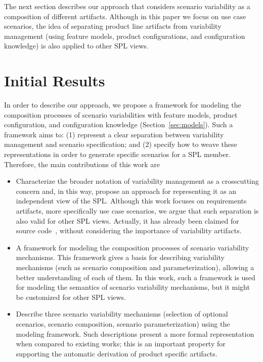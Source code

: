 \documentclass[11pt]{report}
\begin{document}
The next section describes our approach that considers scenario variability as a
composition of different artifacts. Although in this paper we focus on use case
scenarios, the idea of separating product line artifacts from variability
management (using feature models, product configurations, and configuration
knowledge) is also applied to other SPL views.

\chapter{Initial Results}
\label{chapter:initial-results}

In order to describe our approach, we propose 
a framework for modeling the composition processes of scenario 
variabilities with feature models, product configuration, and configuration knowledge (Section~\ref{sec:models}). 
Such a framework aims to: (1) represent a clear separation between variability management 
and scenario specification; and (2) specify how to weave these representations in order to generate
specific scenarios for a SPL member. Therefore, the main contributions of this work are

\begin{itemize}

\item Characterize the broader notation of variability management as a crosscutting concern and, in this way, propose an approach for representing it as an independent view of the SPL. Although this work focuses on requirements artifacts, 
more specifically use case scenarios, we argue that such separation is also valid for other SPL views. Actually,
it has already been claimed for source code~\cite{alves-gpce-06, apel-icse2006}, without considering the importance of variability artifacts.  
  
\item A framework for modeling the composition processes of scenario variability mechanisms. 
This framework gives a basis for describing variability mechanisms (such as scenario composition and parameterization), 
allowing a better understanding of each of them. In this work, such a framework is used for modeling 
the semantics of scenario variability mechanisms, but it might be customized for other SPL views.

\item Describe three scenario variability mechanisms (selection of optional scenarios, scenario composition, scenario parameterization) 
using the modeling framework. Such descriptions present
a more formal representation when compared to existing works; this is an
important property for supporting the automatic derivation of product
specific artifacts.

\end{itemize}
\end{document}
